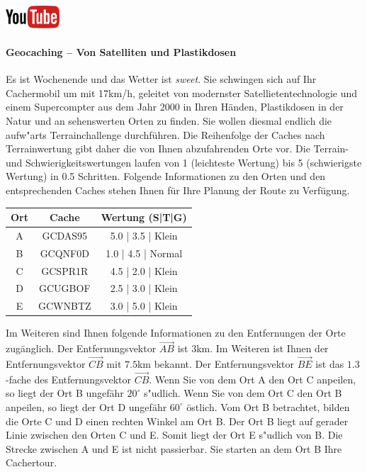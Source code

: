 \documentclass[a4paper, 9pt]{scrartcl}\usepackage[]{graphicx}\usepackage[]{xcolor}
\begin{document}
\hfill\href{https://youtu.be/3LAq3R0rS14}{\includegraphics[width =
  2cm]{img/youtube}} %
\hspace{2Ex}

\paragraph{Geocaching -- Von Satelliten und Plastikdosen}



Es ist Wochenende und das Wetter ist \textit{sweet}. Sie schwingen sich auf
Ihr Cachermobil um mit 17km/h, geleitet von modernster
Satellietentechnologie und einem Supercompter aus dem Jahr 2000 in Ihren
H{\"a}nden, Plastikdosen in der Natur und an sehenswerten Orten zu finden. Sie
wollen diesmal endlich die aufw{"a}rts Terrainchallenge
durchf{\"u}hren. Die Reihenfolge der Caches nach Terrainwertung gibt daher
die von Ihnen abzufahrenden Orte vor. Die Terrain- und
Schwierigkeitswertungen laufen von 1 (leichteste Wertung) bis 5
(schwierigste Wertung) in 0.5 Schritten. Folgende Informationen zu den
Orten und den entsprechenden Caches stehen Ihnen f{\"u}r Ihre Planung der Route
zu Verf{\"u}gung.

\begin{center}
  \begin{tabular}{ ccc }
    \toprule
    Ort & Cache & Wertung (S|T|G) \\
    \midrule
    A & GCDAS95 & 5.0 | 3.5 | Klein \\
    B & GCQNF0D & 1.0 | 4.5 | Normal \\ 
    C & GCSPR1R & 4.5 | 2.0 | Klein \\ 
    D & GCUGBOF & 2.5 | 3.0 | Klein \\ 
    E & GCWNBTZ & 3.0 | 5.0 | Klein \\     
 \bottomrule
\end{tabular}
\end{center}

Im Weiteren sind Ihnen folgende Informationen zu den Entfernungen der Orte
zug{\"a}nglich. Der Entfernungsvektor $\overrightarrow{AB}$ ist
$3$km. Im Weiteren ist Ihnen der Entfernungsvektor
$\overrightarrow{CB}$ mit $7.5$km bekannt. Der
Entfernungsvektor $\overrightarrow{BE}$ ist das $1.3$-fache
des Entfernungsvektor $\overrightarrow{CB}$. Wenn Sie von dem Ort A den Ort
C anpeilen, so liegt der Ort B ungef{\"a}hr $20^\circ$
s{"u}dlich. Wenn Sie von dem Ort C den Ort B anpeilen, so liegt
der Ort D ungef{\"a}hr $60^\circ$ {\"o}stlich. Vom Ort B
betrachtet, bilden die Orte C und D einen rechten Winkel am Ort B. Der Ort
B liegt auf gerader Linie zwischen den Orten C und E. Somit liegt der Ort E
s{"u}dlich von B. Die Strecke zwischen A und E ist nicht
passierbar. Sie starten an dem Ort B Ihre Cachertour. \\
\end{document}
